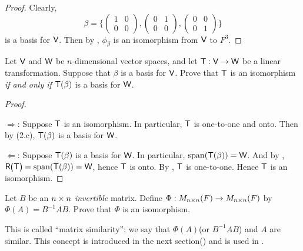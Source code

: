 \begin{proof}
Clearly,
\[\beta = \bigg\{
    \begin{pmatrix} 1 & 0 \\ 0 & 0 \end{pmatrix},
    \begin{pmatrix} 0 & 1 \\ 0 & 0 \end{pmatrix},
    \begin{pmatrix} 0 & 0 \\ 0 & 1 \end{pmatrix}
\bigg\}\]
is a basis for \(\textsf{V}\).
Then by , \(\phi_{\beta}\) is an isomorphism from \(\textsf{V}\) to \(F^3\).
\end{proof}

\begin{exercise} \label{exercise 2.4.15}
Let \(\textsf{V}\) and \(\textsf{W}\) be \(n\)-dimensional vector spaces, and let \(\textsf{T} : \textsf{V} \to \textsf{W}\) be a linear transformation.
Suppose that \(\beta\) is a basis for \(\textsf{V}\).
Prove that \(\textsf{T}\) is an isomorphism \emph{if and only if} \(\textsf{T}(\beta)\) is a basis for \(\textsf{W}\).
\end{exercise}

\begin{proof} \ 

\(\Longrightarrow\): Suppose \(\textsf{T}\) is an isomorphism.
In particular, \(\textsf{T}\) is one-to-one and onto.
Then by (2.c), \(\textsf{T}(\beta)\) is a basis for \(\textsf{W}\).

\(\Longleftarrow\): Suppose \(\textsf{T}(\beta)\) is a basis for \(\textsf{W}\).
In particular, \(\operatorname{span}(\textsf{T}(\beta)) = \textsf{W}\).
And by , \(\textsf{R(T)} = \operatorname{span}(\textsf{T}(\beta)) = \textsf{W}\), hence \(\textsf{T}\) is onto.
By , \(\textsf{T}\) is one-to-one.
Hence \(\textsf{T}\) is an isomorphism.
\end{proof}

\begin{exercise} \label{exercise 2.4.16}
Let \(B\) be an \(n \times n\) \emph{invertible} matrix.
Define \(\Phi : M_{n \times n}(F) \to M_{n \times n}(F)\) by \(\Phi(A) = B^{-1}AB\).
Prove that \(\Phi\) is an isomorphism.
\end{exercise}

\begin{note}
This is called ``matrix similarity''; we say that \(\Phi(A)\)(or \(B^{-1}AB\)) and \(A\) are similar.
This concept is introduced in the next section() and is used in .
\end{note}

